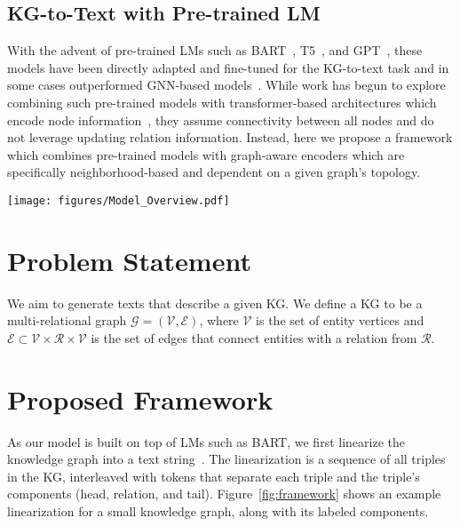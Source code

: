 \documentclass[11pt]{article}
\begin{document}
\subsection{KG-to-Text with Pre-trained LM}
With the advent of pre-trained LMs such as BART~\cite{lewis2020bart}, T5~\cite{raffel2020exploring}, and GPT~\cite{radford2018improving,radford2019language}, these models have been directly adapted and fine-tuned for the KG-to-text task and in some cases outperformed GNN-based models~\cite{ribeiro2020investigating,kale2020text,chen-etal-2020-kgpt,mager2020gpt}. While work has begun to explore combining such pre-trained models with transformer-based architectures which encode node information~\cite{ke-etal-2021-jointgt}, they assume connectivity between all nodes and do not leverage updating relation information. Instead, here we propose a framework which combines pre-trained models with graph-aware encoders which are specifically neighborhood-based and dependent on a given graph's topology.
\begin{figure*}[t]
\centering
\texttt{[image: figures/Model\_Overview.pdf]}
\caption{Overview of the Graph-aware framework for graph-to-text generation. Given a KG, we first transform the graph into its appropriate representation before linearizing the graph. Next, each node of the KG is encoded via a global attention, followed by a graph-aware attention, ultimately being decoded into a sequence of tokens.}
\label{fig:framework}
\end{figure*}


\section{Problem Statement}
We aim to generate texts that describe a given KG. We define a KG to be a multi-relational graph $\mathcal{G}=(\mathcal{V}, \mathcal{E})$, where $\mathcal{V}$ is the set of entity vertices and $\mathcal{E} \subset \mathcal{V} \times \mathcal{R} \times \mathcal{V}$ is the set of edges that connect entities with a relation from $\mathcal{R}$.

\section{Proposed Framework}
As our model is built on top of LMs such as BART, we first linearize the knowledge graph into a text string~\cite{distiawan2018gtr,moryossef2019step,su2021plan}. The linearization is a sequence of all triples in the KG, interleaved with tokens that separate each triple and the triple's components (head, relation, and tail). Figure~\ref{fig:framework} shows an example linearization for a small knowledge graph, along with its labeled components. 
\end{document}
